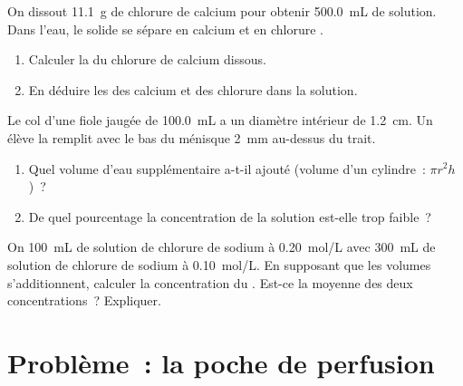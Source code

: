 \begin{exercise}[$\star\star\star$]\label{exo:g10:concentration-and-dilution:13}
On dissout \qty{11.1}{g} de chlorure de calcium  pour obtenir
\qty{500.0}{mL} de solution. Dans l'eau, le solide se sépare en 
calcium  et en  chlorure .
\begin{enumerate}
  \item Calculer la  du chlorure de calcium dissous.
  \item En déduire les  des  calcium et des
         chlorure dans la solution.
\end{enumerate}
\end{exercise}

\begin{exercise}[$\star\star\star$]\label{exo:g10:concentration-and-dilution:14}
Le col d'une fiole jaugée de \qty{100.0}{mL} a un diamètre intérieur de
\qty{1.2}{cm}. Un élève la remplit avec le bas du ménisque
\qty{2}{mm} au-dessus du trait.
\begin{enumerate}
  \item Quel volume d'eau supplémentaire a-t-il ajouté (volume d'un
        cylindre~: $\pi r^2 h$)~?
  \item De quel pourcentage la concentration de la solution est-elle
        trop faible~?
\end{enumerate}
\end{exercise}

\begin{exercise}[$\star\star\star$]\label{exo:g10:concentration-and-dilution:15}
On  \qty{100}{mL} de solution de chlorure de sodium à
\qty{0.20}{mol/L} avec \qty{300}{mL} de solution de chlorure de sodium
à \qty{0.10}{mol/L}. En supposant que les volumes s'additionnent,
calculer la concentration du . Est-ce la moyenne des deux
concentrations~? Expliquer.
\end{exercise}

\section{Problème~: la poche de perfusion}

